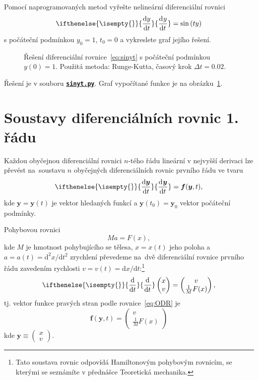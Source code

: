 \documentclass[a4paper,11pt,twoside]{article}
\def\vector#1{\boldsymbol{#1}}								%
\renewcommand{\d}{\mathrm{d}}
\newcommand{\derivative}[3][]{\ifthenelse{\isempty{#1}}	    %
	{\frac{\d{#2}}{\d{#3}}}
	{\frac{\d^{#1}{#2}}{\d{#3}^{#1}}}
}
\def\makematrix#1{\begin{pmatrix}#1\end{pmatrix}}       %
\def\ghfile#1#2{\textnormal{\textbf{\texttt{\href{https://github.com/PavelStransky/PCInPhysics2021/blob/main/#1#2}{#2}}}}}
\theoremstyle{red}
\theoremstyle{green}
\begin{document}
\begin{task}
    Pomocí naprogramovaných metod vyřešte nelineární diferenciální rovnici
    \begin{equation}
        \label{eq:sinyt}
        \derivative{y}{t}=\sin\left(t y\right)
    \end{equation}
    s počáteční podmínkou $y_{0}=1$, $t_{0}=0$ a vykreslete graf jejího řešení.
\end{task}

\begin{solution}
    \begin{figure}[!htb]
        \centering{}
        \caption{
            \protect\small
            Řešení diferenciální rovnice~\eqref{eq:sinyt} s počáteční podmínkou $y(0)=1$.
            Použitá metoda: Runge-Kutta, časový krok $\Delta t=0.02$.
        }
        \label{fig:sinyt}
    \end{figure}

    Řešení je v souboru \ghfile{python/ode/}{sinyt.py}.
    Graf vypočítané funkce je na obrázku~\ref{fig:sinyt}.
\end{solution}


\section{Soustavy diferenciálních rovnic 1. řádu}
\label{sec:ODRn}
    Každou obyčejnou diferenciální rovnici $n$-tého řádu lineární v nejvyšší derivaci lze převést na~soustavu $n$ obyčejných diferenciálních rovnic prvního řádu ve tvaru
    \begin{equation}\label{eq:ODR}
        \derivative{\vector{y}}{t}=\vector{f}(\vector{y},t),
    \end{equation}
    kde $\vector{y}=\vector{y}(t)$ je vektor hledaných funkcí a $\vector{y}(t_{0})=\vector{y}_{0}$ vektor počáteční podmínky.

    \begin{example}
        Pohybovou rovnici
        \begin{equation}
            Ma=F(x),
        \end{equation}
        kde $M$ je hmotnost pohybujícího se tělesa, $x=x(t)$ jeho poloha a $a=a(t)=\d^{2}x/\d t^{2}$ zrychlení převedeme na~dvě diferenciální rovnice prvního řádu zavedením rychlosti $v=v(t)=\d x/\d t$:\footnote{
            Tato soustava rovnic odpovídá Hamiltonovým pohybovým rovnicím, se kterými se seznámíte v přednášce Teoretická mechanika.
        }
        \begin{equation}
            \derivative{}{t}\makematrix{x \\ v}=\makematrix{v \\ \frac{1}{M}F(x)},
        \end{equation}
        tj. vektor funkce pravých stran podle rovnice~\eqref{eq:ODR} je
        \begin{equation}
            \vector{f}(\vector{y},t)=\makematrix{v \\ \frac{1}{M}F(x)}
        \end{equation}
        kde $\vector{y}\equiv\makematrix{x \\ v}$.
    \end{example}
\end{document}
